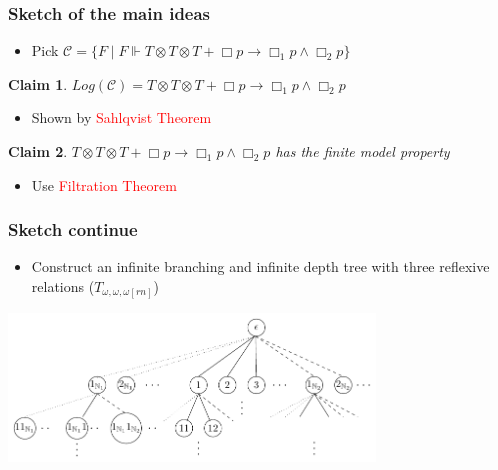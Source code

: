 \documentclass[hyperref={pdfpagelabels=false},t,10pt]{beamer}
\newtheorem{claim}{Claim}
\begin{document}
\begin{frame}
  \frametitle{Sketch of the main ideas}
  \begin{itemize}
    \item Pick $\mathcal{C} = \{F \mid F \Vdash T \otimes T\otimes T + \Box p \rightarrow \Box_1 p \land \Box_2 p\}$  \pause
    \end{itemize}

    \begin{claim}
      $Log(\mathcal{C}) = T \otimes T \otimes T + \Box p \rightarrow \Box_1 p \land \Box_2 p$
    \end{claim} \pause

    \begin{itemize}
      \item  Shown by \textcolor{red}{Sahlqvist Theorem}
    \end{itemize}
    \pause

    \begin{claim}
      $T \otimes T \otimes T + \Box p \rightarrow \Box_1 p \land \Box_2 p$ has the finite model property
    \end{claim}
    \pause

    \begin{itemize}
      \item Use \textcolor{red}{Filtration Theorem}
    \end{itemize}



\end{frame}

\begin{frame}
  \frametitle{Sketch continue}
  \begin{itemize}
    \item Construct an infinite branching and infinite depth tree with three reflexive relations ($T_{\omega,\omega,\omega[rn]}$) \pause
  \end{itemize}
  \centering
  \includegraphics[width=0.73\textwidth]{Example7.pdf}
    
  \end{frame}
\end{document}
